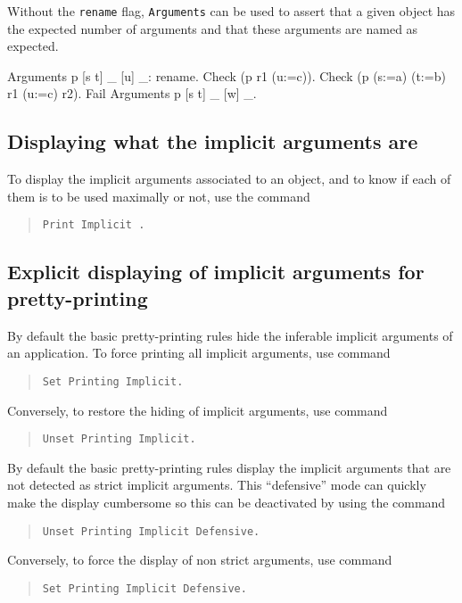 Without the {\tt rename} flag, {\tt Arguments} can be used to assert
that a given object has the expected number of arguments and that
these arguments are named as expected.

\begin{coq_example}
Arguments p [s t] _ [u] _: rename.
Check (p r1 (u:=c)).
Check (p (s:=a) (t:=b) r1 (u:=c) r2).
Fail Arguments p [s t] _ [w] _.
\end{coq_example}


\subsection{Displaying what the implicit arguments are
\label{PrintImplicit}}

To display the implicit arguments associated to an object, and to know
if each of them is to be used maximally or not, use the command
\begin{quote}
\tt Print Implicit {\qualid}.
\end{quote}

\subsection{Explicit displaying of implicit arguments for pretty-printing
}

By default the basic pretty-printing rules hide the inferable implicit
arguments of an application. To force printing all implicit arguments,
use command
\begin{quote}
{\tt Set Printing Implicit.}
\end{quote}
Conversely, to restore the hiding of implicit arguments, use command
\begin{quote}
{\tt Unset Printing Implicit.}
\end{quote}

By default the basic pretty-printing rules display the implicit arguments that are not detected as strict implicit arguments. This ``defensive'' mode can quickly make the display cumbersome so this can be deactivated by using the command
\begin{quote}
{\tt Unset Printing Implicit Defensive.}
\end{quote}
Conversely, to force the display of non strict arguments, use command
\begin{quote}
{\tt Set Printing Implicit Defensive.}
\end{quote}

